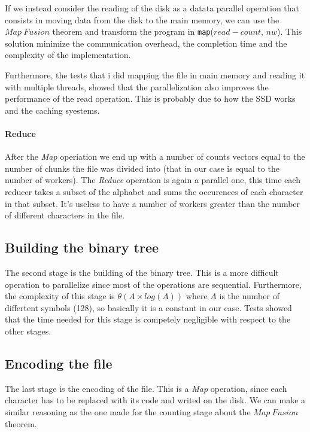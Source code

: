 \documentclass[12pt, letterpaper]{article}  %
\begin{document}
If we instead consider the reading of the disk as a datata parallel operation that consists in moving data from the disk to the main memory, we can use the $Map\ Fusion$ theorem and transform the program in \texttt{map}($read-count$, $nw$). This solution minimize the communication overhead, the completion time and the complexity of the implementation.


Furthermore, the tests that i did mapping the file in main memory and reading it with multiple threads, showed that the parallelization
also improves the performance of the read operation. This is probably due to how the SSD works and the caching syestems. 

\paragraph*{Reduce}
After the \textit{Map} operiation we end up with a number of counts vectors equal to the number of chunks the file was divided into (that in our case is equal to the number of workers). The \textit{Reduce} operation is again a parallel one, this time each reducer takes a subset of the alphabet and sums the occurences of each character in that subset. It's useless to have a number of workers greater than the number of different characters in the file.

\subsection{Building the binary tree}
The second stage is the building of the binary tree. This is a more difficult operation to parallelize since 
most of the operations are sequential. Furthermore, the complexity of this stage is $\theta(A \times log (A))$  where 
$A$ is the number of differtent symbols (128), so basically it is a constant in our case. Tests showed that the time needed for this stage is competely negligible with respect to the other stages.

\subsection{Encoding the file}
The last stage is the encoding of the file. This is a \textit{Map} operation, since each character has to be replaced with its code and writed on the disk. We can make a similar reasoning as the one made for the counting stage about the $Map\ Fusion$ theorem.
\end{document}
